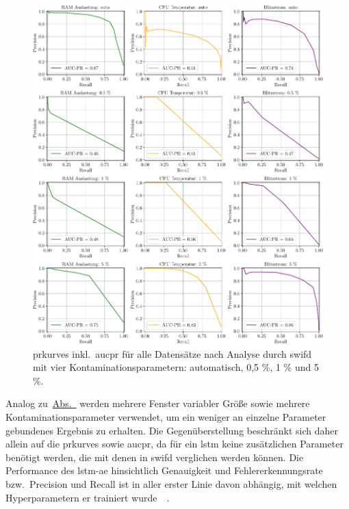 \begin{figure}[t!]
    \centering
        \includegraphics[width=1\linewidth]{ch5_anomalieerkennung/abbildungen/SWIFD_PR_AUC_PR.pdf}
    \caption{\centering \acp{prkurve} inkl.~\acs*{aucpr} für alle Datensätze nach Analyse durch \acs*{swifd} mit vier Kontaminationsparametern:
    automatisch, 0,5 \%, 1 \% und 5 \%.}
    \label{fig:SWIFD_AUC_PR}
\end{figure}

Analog zu~\hyperref[sec:punktanomaliedetektion]{Abs.~} werden mehrere Fenster variabler Größe sowie mehrere
Kontaminationsparameter verwendet, um ein weniger an einzelne Parameter gebundenes Ergebnis zu erhalten. Die Gegenüberstellung
beschränkt sich daher allein auf die \acp{prkurve} sowie \ac{aucpr}, da für ein \ac{lstm} keine zusätzlichen Parameter benötigt werden, die mit denen
in \ac{swifd} verglichen werden können. Die Performance des \ac{lstm-ae} hinsichtlich Genauigkeit und Fehlererkennungsrate bzw.~Precision und Recall
ist in aller erster Linie davon abhängig, mit welchen Hyperparametern er trainiert wurde~\cite{Wei2022}~\cite{Lachekhab2024}.

